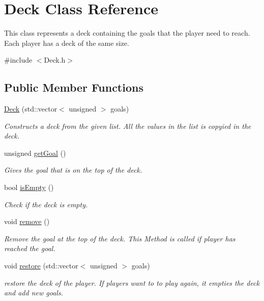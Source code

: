 \hypertarget{classDeck}{}\section{Deck Class Reference}
\label{classDeck}


This class represents a deck containing the goals that the player need to reach. Each player has a deck of the same size.  




{\ttfamily \#include $<$Deck.\+h$>$}

\subsection*{Public Member Functions}
\begin{DoxyCompactItemize}
\item 
\mbox{\hyperlink{classDeck_a10459a37e09fe362ae163dc7ae645f0e}{Deck}} (std\+::vector$<$ unsigned $>$ goals)
\begin{DoxyCompactList}\small\item\em Constructs a deck from the given list. All the values in the list is copyied in the deck. \end{DoxyCompactList}\item 
unsigned \mbox{\hyperlink{classDeck_ac8eb3ae174a4bec598b13ff53730efe2}{get\+Goal}} ()
\begin{DoxyCompactList}\small\item\em Gives the goal that is on the top of the deck. \end{DoxyCompactList}\item 
bool \mbox{\hyperlink{classDeck_a0233c3d2ab48074ba0bb196d958d9dff}{is\+Empty}} ()
\begin{DoxyCompactList}\small\item\em Check if the deck is empty. \end{DoxyCompactList}\item 
void \mbox{\hyperlink{classDeck_afe89a25e4f68a07c9b83b9223fc0e58b}{remove}} ()
\begin{DoxyCompactList}\small\item\em Remove the goal at the top of the deck. This Method is called if player has reached the goal. \end{DoxyCompactList}\item 
void \mbox{\hyperlink{classDeck_abeb7668dc06b3f8118bf507234fb8ff4}{restore}} (std\+::vector$<$ unsigned $>$ goals)
\begin{DoxyCompactList}\small\item\em restore the deck of the player. If players want to to play again, it empties the deck and add new goals. \end{DoxyCompactList}\end{DoxyCompactItemize}


